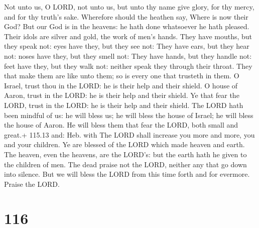  Not unto us, O LORD, not unto us, but unto thy name give
glory, for thy mercy, and for thy truth's sake.  Wherefore
should the heathen say, Where is now their God?  But our God
is in the heavens: he hath done whatsoever he hath pleased. 
Their idols are silver and gold, the work of men's hands. 
They have mouths, but they speak not: eyes have they, but they see not:
 They have ears, but they hear not: noses have they, but
they smell not:  They have hands, but they handle not: feet
have they, but they walk not: neither speak they through their throat.
 They that make them are like unto them; so is every one
that trusteth in them.  O Israel, trust thou in the LORD: he
is their help and their shield.  O house of Aaron, trust in
the LORD: he is their help and their shield.  Ye that fear
the LORD, trust in the LORD: he is their help and their shield.
 The LORD hath been mindful of us: he will bless us; he
will bless the house of Israel; he will bless the house of Aaron.
 He will bless them that fear the LORD, both small and
great.+ 115.13 and: Heb. with  The LORD shall increase you
more and more, you and your children.  Ye are blessed of
the LORD which made heaven and earth.  The heaven, even the
heavens, are the LORD's: but the earth hath he given to the children of
men.  The dead praise not the LORD, neither any that go
down into silence.  But we will bless the LORD from this
time forth and for evermore. Praise the LORD.

\hypertarget{section-115}{%
\section{116}\label{section-115}}

